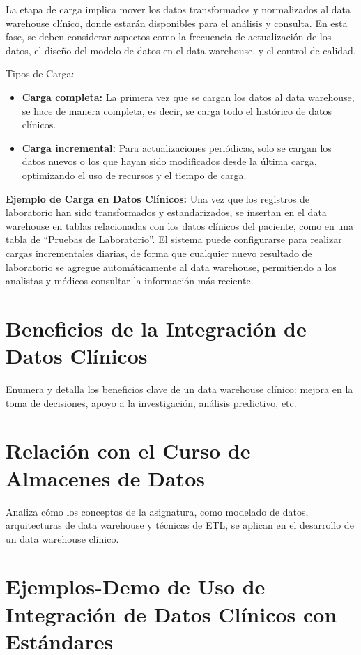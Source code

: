 \documentclass[12pt, a4paper, twoside]{article}
\begin{document}
	La etapa de carga implica mover los datos transformados y normalizados al data warehouse clínico, donde estarán disponibles para el análisis y consulta. En esta fase, se deben considerar aspectos como la frecuencia de actualización de los datos, el diseño del modelo de datos en el data warehouse, y el control de calidad.
	
	Tipos de Carga:
	\begin{itemize}
		\item \textbf{Carga completa:} La primera vez que se cargan los datos al data warehouse, se hace de manera completa, es decir, se carga todo el histórico de datos clínicos.
		
		\item \textbf{Carga incremental:} Para actualizaciones periódicas, solo se cargan los datos nuevos o los que hayan sido modificados desde la última carga, optimizando el uso de recursos y el tiempo de carga.
	\end{itemize}
	
	\textbf{Ejemplo de Carga en Datos Clínicos:} Una vez que los registros de laboratorio han sido transformados y estandarizados, se insertan en el data warehouse en tablas relacionadas con los datos clínicos del paciente, como en una tabla de “Pruebas de Laboratorio”. El sistema puede configurarse para realizar cargas incrementales diarias, de forma que cualquier nuevo resultado de laboratorio se agregue automáticamente al data warehouse, permitiendo a los analistas y médicos consultar la información más reciente.
	
	
	\section{Beneficios de la Integración de Datos Clínicos}
	Enumera y detalla los beneficios clave de un data warehouse clínico: mejora en la toma de decisiones, apoyo a la investigación, análisis predictivo, etc.
	
	\section{Relación con el Curso de Almacenes de Datos}
	Analiza cómo los conceptos de la asignatura, como modelado de datos, arquitecturas de data warehouse y técnicas de ETL, se aplican en el desarrollo de un data warehouse clínico.
	
	\section{Ejemplos-Demo de Uso de Integración de Datos Clínicos con Estándares}
	
\end{document}
